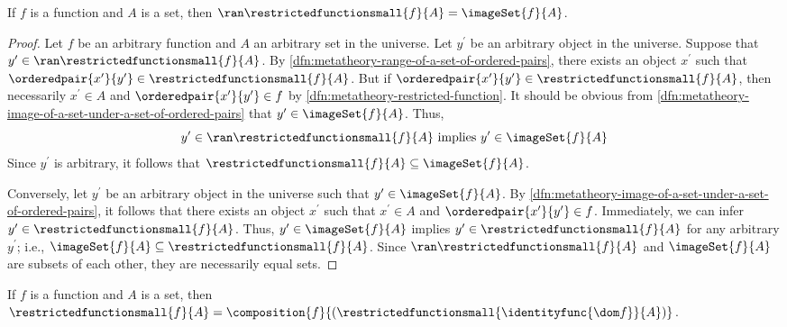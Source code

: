 \begin{thm}
     \label{thm:metatheory-the-range-of-a-restriction-is-the-image-of-the-function-under-the-restricted-domain}
    If \( f \) is a function and \( A \) is a set, then \( \ran \restrictedfunctionsmall{f}{A} = \imageSet{f}{A} \).
\end{thm}

\begin{proof}
    Let \( f \) be an arbitrary function and \( A \) an arbitrary set in the universe.
    Let \( y^{\prime} \) be an arbitrary object in the universe.
    Suppose that \( y^{\prime} \in \ran \restrictedfunctionsmall{f}{A} \).
    By \cref{dfn:metatheory-range-of-a-set-of-ordered-pairs}, there exists an object \( x^{\prime}\) such that \( \orderedpair{x^{\prime}}{y^{\prime}} \in \restrictedfunctionsmall{f}{A} \).
    But if \( \orderedpair{x^{\prime}}{y^{\prime}} \in \restrictedfunctionsmall{f}{A} \), then necessarily
    \( x^{\prime} \in A \) and \( \orderedpair{x^{\prime}}{y^{\prime}} \in f \) by \cref{dfn:metatheory-restricted-function}.
    It should be obvious from \cref{dfn:metatheory-image-of-a-set-under-a-set-of-ordered-pairs} that \( y^{\prime} \in \imageSet{f}{A} \).
    Thus,
    \begin{equation*}
        y^{\prime} \in \ran \restrictedfunctionsmall{f}{A} \ \text{implies} \ y^{\prime} \in \imageSet{f}{A}
    \end{equation*}
    Since \( y^{\prime} \) is arbitrary, it follows that \( \restrictedfunctionsmall{f}{A} \subseteq \imageSet{f}{A} \).

    \vspace{0.3cm}
    \noindent
    Conversely, let \( y^{\prime} \) be an arbitrary object in the universe such that \( y^{\prime} \in \imageSet{f}{A} \).
    By \cref{dfn:metatheory-image-of-a-set-under-a-set-of-ordered-pairs}, it follows that there exists an object \( x^{\prime} \) such that
    \( x^{\prime} \in A \) and \( \orderedpair{x^{\prime}}{y^{\prime}} \in f \).
    Immediately, we can infer \( y^{\prime} \in \restrictedfunctionsmall{f}{A} \).
    Thus, \( y^{\prime} \in \imageSet{f}{A} \) implies \( y^{\prime} \in \restrictedfunctionsmall{f}{A} \) for any arbitrary \( y^{\prime} \);
    i.e., \( \imageSet{f}{A} \subseteq \restrictedfunctionsmall{f}{A} \).
    Since \( \ran \restrictedfunctionsmall{f}{A} \) and \( \imageSet{f}{A} \) are subsets of each other, they are necessarily equal sets.
\end{proof}

\begin{thm}
     \label{thm:metatheory-the-restriction-of-a-function-to-a-set-in-terms-of-composition}
    If \( f \) is a function and \( A \) is a set,
    then \( \restrictedfunctionsmall{f}{A} = \composition{f}{ \mleft( \restrictedfunctionsmall{ \identityfunc{\dom f} }{A} \mright) }\).
\end{thm}

